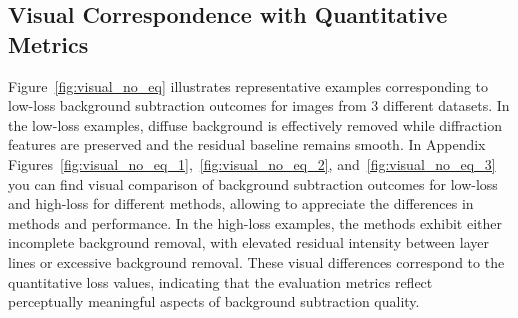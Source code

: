 \documentclass[iucr]{iucrjournals}
\begin{document}
\subsection{Visual Correspondence with Quantitative Metrics}

Figure~\ref{fig:visual_no_eq} illustrates representative examples corresponding to low-loss background subtraction outcomes for images from 3 different datasets. In the low-loss examples, diffuse background is effectively removed while diffraction features are preserved and the residual baseline remains smooth. In Appendix Figures~\ref{fig:visual_no_eq_1},~\ref{fig:visual_no_eq_2}, and~\ref{fig:visual_no_eq_3} you can find visual comparison of background subtraction outcomes for low-loss and high-loss for different methods, allowing to appreciate the differences in methods and performance. In the high-loss examples, the methods exhibit either incomplete background removal, with elevated residual intensity between layer lines or excessive background removal. These visual differences correspond to the quantitative loss values, indicating that the evaluation metrics reflect perceptually meaningful aspects of background subtraction quality.

\end{document}
